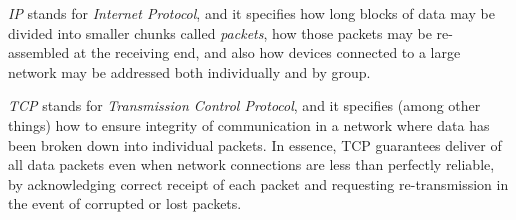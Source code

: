 





{\it IP} stands for {\it Internet Protocol}, and it specifies how long blocks of data may be divided into smaller chunks called {\it packets}, how those packets may be re-assembled at the receiving end, and also how devices connected to a large network may be addressed both individually and by group.

\vskip 10pt

{\it TCP} stands for {\it Transmission Control Protocol}, and it specifies (among other things) how to ensure  integrity of communication in a network where data has been broken down into individual packets.  In essence, TCP guarantees deliver of all data packets even when network connections are less than perfectly reliable, by acknowledging correct receipt of each packet and requesting re-transmission in the event of corrupted or lost packets.











